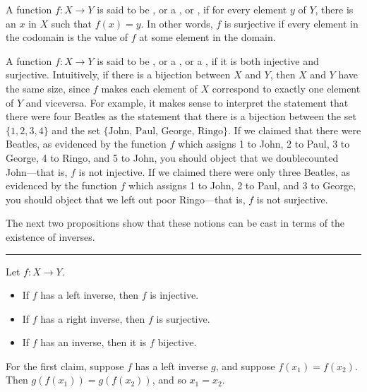 \documentclass[letterpaper,10pt,english]{sphinxmanual}
\begin{document}
\sphinxAtStartPar
A function \(f : X \to Y\) is said to be , or a , or , if for every element \(y\) of \(Y\), there is an \(x\) in \(X\) such that \(f(x) = y\). In other words, \(f\) is surjective if every element in the codomain is the value of \(f\) at some element in the domain.

\sphinxAtStartPar
A function \(f : X \to Y\) is said to be , or a , or a , if it is both injective and surjective. Intuitively, if there is a bijection between \(X\) and \(Y\), then \(X\) and \(Y\) have the same size, since \(f\) makes each element of \(X\) correspond to exactly one element of \(Y\) and vice\sphinxhyphen{}versa. For example, it makes sense to interpret the statement that there were four Beatles as the statement that there is a bijection between the set \(\{1, 2, 3, 4\}\) and the set \(\{ \text{John, Paul, George, Ringo} \}\). If we claimed that there were  Beatles, as evidenced by the function \(f\) which assigns 1 to John, 2 to Paul, 3 to George, 4 to Ringo, and 5 to John, you should object that we double\sphinxhyphen{}counted John—that is, \(f\) is not injective. If we claimed there were only three Beatles, as evidenced by the function \(f\) which assigns 1 to John, 2 to Paul, and 3 to George, you should object that we left out poor Ringo—that is, \(f\) is not surjective.

\sphinxAtStartPar
The next two propositions show that these notions can be cast in terms of the existence of inverses.


\bigskip\hrule\bigskip


\sphinxAtStartPar
{} Let \(f : X \to Y\).
\begin{itemize}
\item {} 
\sphinxAtStartPar
If \(f\) has a left inverse, then \(f\) is injective.

\item {} 
\sphinxAtStartPar
If \(f\) has a right inverse, then \(f\) is surjective.

\item {} 
\sphinxAtStartPar
If \(f\) has an inverse, then it is \(f\) bijective.

\end{itemize}

\sphinxAtStartPar
{} For the first claim, suppose \(f\) has a left inverse \(g\), and suppose \(f(x_1) = f(x_2)\). Then \(g(f(x_1)) = g(f(x_2))\), and so \(x_1 = x_2\).
\end{document}
